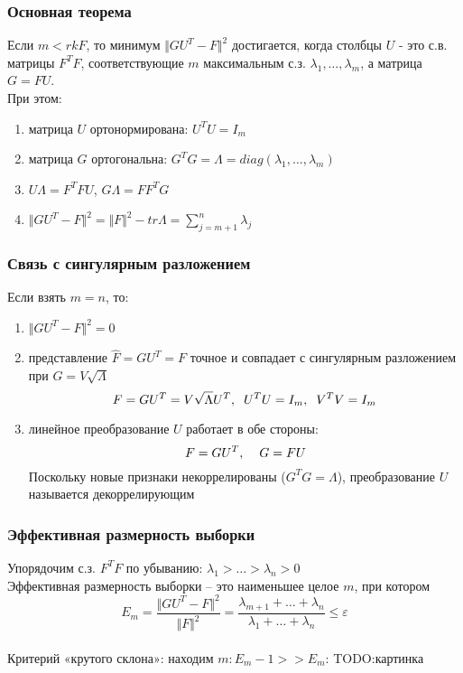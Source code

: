 \documentclass[12pt]{beamer}
\begin{document}
\begin{frame}\frametitle{Основная теорема}
Если $m < rk F$, то минимум $\Vert GU^T - F \Vert^2$ достигается, когда столбцы $U$ - это с.в. матрицы $F^TF$, соответствующие $m$ максимальным с.з. $\lambda_1,\dots, \lambda_m$, а матрица $G = FU$.\\
При этом:\\
\begin{enumerate}[--]
\item матрица $U$ ортонормирована: $U^TU = I_m$
\item матрица $G$ ортогональна: $G^TG = \Lambda = diag(\lambda_1, \dots, \lambda_m)$
\item $U\Lambda = F^TFU$,  $G\Lambda = FF^TG$
\item $\Vert GU^T - F \Vert^2 = \Vert F \Vert^2 - tr \Lambda = \sum\limits_{j=m+1}^n \lambda_j$
\end{enumerate}

\end{frame}

\begin{frame}\frametitle{Связь с сингулярным разложением}
Если взять $m = n$, то:\\
\begin{enumerate}[--]
\item $\Vert GU^T - F \Vert^2 = 0$
\item представление $\hat{F} = GU^T = F$ точное и совпадает с сингулярным разложением при $G = V \sqrt{\Lambda}$
$$F = GU^T = V\sqrt{\Lambda}U^T, \hspace{2mm} U^TU = I_m, \hspace{2mm} V^TV = I_m$$
\item линейное преобразование $U$ работает в обе стороны:\\
$$F= GU^T, \hspace{4mm} G=FU$$
Поскольку новые признаки некоррелированы ($G^TG = \Lambda$), преобразование $U$ называется декоррелирующим
\end{enumerate}
\end{frame}

\begin{frame}\frametitle{Эффективная размерность выборки}
Упорядочим с.з. $F^TF$ по убыванию: $\lambda_1 > \dots > \lambda_n > 0$\\
Эффективная размерность выборки -- это наименьшее целое $m$, при котором\\
$$E_m = \frac{\Vert GU^T - F \Vert^2}{\Vert F \Vert^2} = \frac{\lambda_{m+1} + \dots + \lambda_{n}}{\lambda_1 + \dots + \lambda_n} \leq \varepsilon$$\\
Критерий «крутого склона»: находим $m: E_m-1 >> E_m$:
TODO:картинка
\end{frame}
\end{document}
